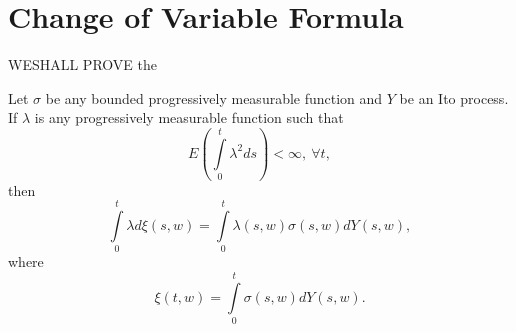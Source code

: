 \chapter{Change of Variable Formula}\label{chap12}

WE\pageoriginale SHALL PROVE the

\begin{theorem*}
Let $\sigma$ be any bounded progressively measurable function and $Y$
be an Ito process. If $\lambda$ is any progressively measurable
function such that
$$
E\left(\int\limits^{t}_{0}\lambda^{2}ds\right)<\infty,\ \forall t,
$$
then
\begin{equation*}
\int\limits^{t}_{0}\lambda
d\xi(s,w)=\int\limits^{t}_{0}\lambda(s,w)\sigma(s,w)dY(s,w),\tag{*} 
\end{equation*}
where 
$$
\xi(t,w)=\int\limits^{t}_{0}\sigma(s,w)dY(s,w).
$$
\end{theorem*}

